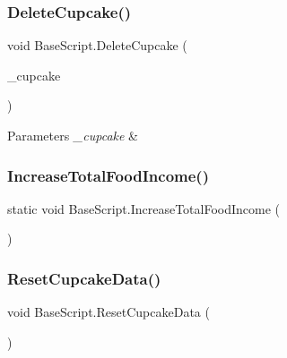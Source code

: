 \mbox{\label{class_base_script_a2cccfe7987370235977b1bad4020c423}} 
\subsubsection{\texorpdfstring{DeleteCupcake()}{DeleteCupcake()}}
{\footnotesize\ttfamily void Base\+Script.\+Delete\+Cupcake (\begin{DoxyParamCaption}\item[{\mbox{\hyperlink{class_cupcake_data_script}{Cupcake\+Data\+Script}}}]{\+\_\+cupcake }\end{DoxyParamCaption})}






\begin{DoxyParams}{Parameters}
{\em \+\_\+cupcake} & \\
\hline
\end{DoxyParams}
\mbox{\label{class_base_script_a527e535058b1b6b125e0e36e0e8c152f}} 
\subsubsection{\texorpdfstring{IncreaseTotalFoodIncome()}{IncreaseTotalFoodIncome()}}
{\footnotesize\ttfamily static void Base\+Script.\+Increase\+Total\+Food\+Income (\begin{DoxyParamCaption}{ }\end{DoxyParamCaption})\hspace{0.3cm}{\ttfamily [static]}}





\mbox{\label{class_base_script_a7460c7d0fb79fcbcfc9d70441c1d4e8a}} 
\subsubsection{\texorpdfstring{ResetCupcakeData()}{ResetCupcakeData()}}
{\footnotesize\ttfamily void Base\+Script.\+Reset\+Cupcake\+Data (\begin{DoxyParamCaption}{ }\end{DoxyParamCaption})}







